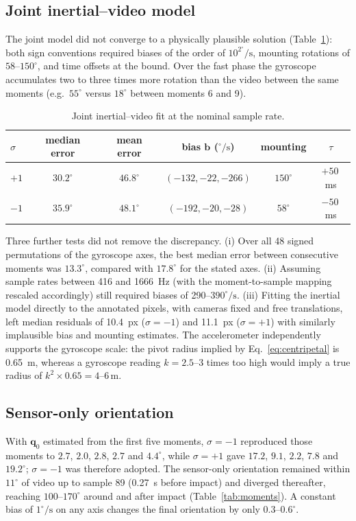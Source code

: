 \documentclass[11pt,a4paper]{article}
\newcommand{\q}{\bm{q}}
\newcommand{\ve}[1]{\bm{#1}}
\newcommand{\dg}{^{\circ}}
\begin{document}
\subsection{Joint inertial--video model}
The joint model did not converge to a physically plausible solution (Table~\ref{tab:joint}): both
sign conventions required biases of the order of $10^2\dg/\mathrm{s}$, mounting rotations of
$58$--$150\dg$, and time offsets at the bound. Over the fast phase the gyroscope accumulates two to
three times more rotation than the video between the same moments (e.g.\ $55\dg$ versus $18\dg$
between moments 6 and 9).

\begin{table}[H]\centering\small
\caption{Joint inertial--video fit at the nominal sample rate.}\label{tab:joint}
\begin{tabular}{@{}lccccc@{}}\toprule
$\sigma$ & median error & mean error & bias $\ve b$ ($\dg/\mathrm{s}$) & mounting & $\tau$ \\\midrule
$+1$ & $30.2\dg$ & $46.8\dg$ & $(-132,-22,-266)$ & $150\dg$ & $+50$\,ms \\
$-1$ & $35.9\dg$ & $48.1\dg$ & $(-192,-20,-28)$ & $58\dg$ & $-50$\,ms \\\bottomrule
\end{tabular}
\end{table}

Three further tests did not remove the discrepancy. (i) Over all 48 signed permutations of the
gyroscope axes, the best median error between consecutive moments was $13.3\dg$, compared with
$17.8\dg$ for the stated axes. (ii) Assuming sample rates between 416 and \SI{1666}{Hz} (with the
moment-to-sample mapping rescaled accordingly) still required biases of 290--$390\dg/\mathrm{s}$.
(iii) Fitting the inertial model directly to the annotated pixels, with cameras fixed and free
translations, left median residuals of \SI{10.4}{px} ($\sigma=-1$) and \SI{11.1}{px} ($\sigma=+1$)
with similarly implausible bias and mounting estimates. The accelerometer independently supports the
gyroscope scale: the pivot radius implied by Eq.~\eqref{eq:centripetal} is \SI{0.65}{m}, whereas a
gyroscope reading $k=2.5$--$3$ times too high would imply a true radius of $k^2\times0.65=4$--$6$\,m.

\subsection{Sensor-only orientation}
With $\q_0$ estimated from the first five moments, $\sigma=-1$ reproduced those moments to
$2.7$, $2.0$, $2.8$, $2.7$ and $4.4\dg$, while $\sigma=+1$ gave $17.2$, $9.1$, $2.2$, $7.8$ and
$19.2\dg$; $\sigma=-1$ was therefore adopted. The sensor-only orientation remained within $11\dg$ of
video up to sample 89 (\SI{0.27}{s} before impact) and diverged thereafter, reaching
$100$--$170\dg$ around and after impact (Table~\ref{tab:moments}). A constant bias of
$1\dg/\mathrm{s}$ on any axis changes the final orientation by only $0.3$--$0.6\dg$.
\end{document}
